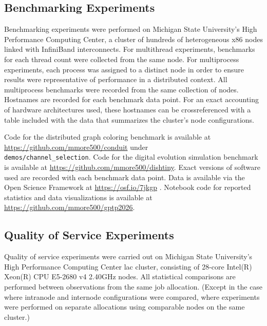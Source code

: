 \subsection{Benchmarking Experiments} \label{moreno:sec:methods-code-data-reproducibility-benchmarking-experiments}

Benchmarking experiments were performed on Michigan State University's High Performance Computing Center, a cluster of hundreds of heterogeneous x86 nodes linked with InfiniBand interconnects.
For multithread experiments, benchmarks for each thread count were collected from the same node.
For multiprocess experiments, each process was assigned to a distinct node in order to ensure results were representative of performance in a distributed context.
All multiprocess benchmarks were recorded from the same collection of nodes.
Hostnames are recorded for each benchmark data point.
For an exact accounting of hardware architectures used, these hostnames can be crossreferenced with a table included with the data that summarizes the cluster's node configurations.

Code for the distributed graph coloring benchmark is available at \url{https://github.com/mmore500/conduit} under \\ \texttt{demos/channel\_selection}.
Code for the digital evolution simulation benchmark is available at \url{https://github.com/mmore500/dishtiny}.
Exact versions of software used are recorded with each benchmark data point.
Data is available via the Open Science Framework at \url{https://osf.io/7jkgp} \cite{foster2017open}.
Notebook code for reported statistics and data visualizations is available at \url{https://github.com/mmore500/gptp2026}.

\subsection{Quality of Service Experiments}

Quality of service experiments were carried out on Michigan State University's High Performance Computing Center lac cluster, consisting of 28-core Intel(R) Xeon(R) CPU E5-2680 v4 \@ 2.40GHz nodes.
All statistical comparisons are performed between observations from the same job allocation.
(Except in the case where intranode and internode configurations were compared, where experiments were performed on separate allocations using comparable nodes on the same cluster.)

